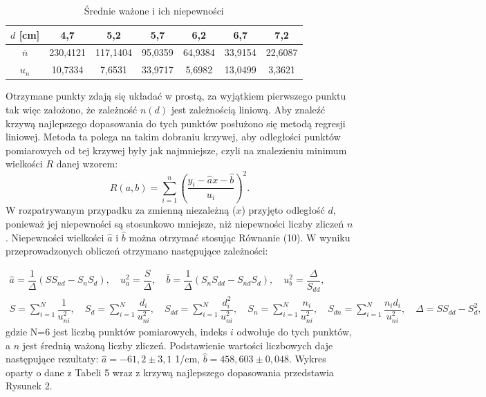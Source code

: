\documentclass[10pt,a4paper]{article}
\begin{document}
\begin{table}[h!]
\centering
\caption{Średnie ważone i ich niepewności}
\label{t5}
\begin{tabular}{|c|c|c|c|c|c|c|}
\hline
$d$ [cm]  & 4,7      & 5,2      & 5,7      & 6,2      & 6,7      & 7,2      \\ \hline
$\bar{n}$ & 230,4121 & 117,1404 & 95,0359  & 64,9384 & 33,9154 & 22,6087  \\ \hline
$u_{n}$   & 10,7334 & 7,6531 & 33,9717 & 5,6982 & 13,0499 & 3,3621 \\ \hline
\end{tabular}
\end{table} 

Otrzymane punkty zdają się układać w prostą, za wyjątkiem pierwszego punktu tak więc założono, że zależność $n(d)$ jest zależnością liniową. Aby znaleźć krzywą najlepszego dopasowania do tych punktów posłużono się metodą regresji liniowej. Metoda ta polega na takim dobraniu krzywej, aby odległości punktów pomiarowych od tej krzywej były jak najmniejsze, czyli na znalezieniu minimum wielkości $R$ danej wzorem:
 \begin{equation}
 R(a,b)=\sum_{i=1}^n\left(\dfrac{y_i-\hat{a}x-\hat{b}}{u_i}\right)^2.
 \end{equation}
W rozpatrywanym przypadku za zmienną niezależną ($x$) przyjęto odległość $d$, ponieważ jej niepewności są stosunkowo mniejsze, niż niepewności liczby zliczeń $n$. Niepewności wielkości $\hat{a}$ i $\hat{b}$ można otrzymać stosując Równanie (10). W wyniku przeprowadzonych obliczeń otrzymano następujące zależności:

\begin{eqnarray*}
 \hat{a}=\dfrac{1}{\Delta}\left(SS_{nd}-S_{n}S_{d}\right), \quad  u_{a}^2=\dfrac{S}{\Delta}, \quad \hat{b}=\dfrac{1}{\Delta}\left(S_{n}S_{dd}-S_{n d}S_{d}\right), \quad u^2_{b}=\dfrac{\Delta}{S_{dd}},  \\
 S=\sum_{i=1}^{N}\dfrac{1}{u_{n i}^2}, \quad S_{d}=\sum_{i=1}^{N}\dfrac{d_{i}}{u_{n i}^2}, \quad S_{dd}=\sum_{i=1}^{N}\dfrac{d_{i}^2}{u_{n i}^2}, \quad S_{n}=\sum_{i=1}^{N}\dfrac{n_{i}}{u_{n i}^2}, \quad S_{d n}=\sum_{i=1}^{N}\dfrac{n_{i}d_{i}}{u_{n i}^2}, \quad \Delta=SS_{dd}-S_{d}^2,
 \end{eqnarray*}
gdzie N=6 jest liczbą punktów pomiarowych, indeks $i$ odwołuje do tych punktów, a $n$ jest średnią ważoną liczby zliczeń. Podstawienie wartości liczbowych daje następujące rezultaty: $\hat{a}=-61,2\pm3,1$ 1/cm, $\hat{b}=458,603\pm0,048$. Wykres oparty o dane z Tabeli 5 wraz z krzywą najlepszego dopasowania przedstawia Rysunek 2. 
\end{document}
